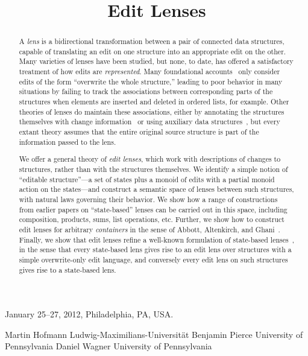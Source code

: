 \documentclass{sigplanconf}
\begin{document}
 {January 25--27, 2012, Philadelphia, PA, USA.}

\title{Edit Lenses}
\ifanon
\authorinfo
    {}
    {}
    {}
\else
\authorinfo
    {Martin Hofmann}
    {Ludwig-Maximilians-Universit\"at}
    {}
\authorinfo
    {Benjamin Pierce}
    {University of Pennsylvania}
    {}
\authorinfo
    {Daniel Wagner}
    {University of Pennsylvania}
    {}
\fi

\maketitle
\begin{abstract}
A {\em lens} is a bidirectional transformation between a pair of connected
data structures, capable of translating an edit on one structure into an
appropriate edit on the other.
%
Many varieties of lenses have been studied, but none, to date, has offered a
satisfactory treatment of how edits are {\em represented}.  Many
foundational accounts~\cite{Focal2005,HofmannPierceWagner10} only consider
edits of the form ``overwrite the whole structure,'' leading to poor
behavior in many situations by failing to track the
associations between corresponding parts of the structures when elements are
inserted and deleted in ordered lists, for example.  Other theories of
lenses do maintain these associations, either by annotating the structures
themselves with change information~\cite{HuModels07,
  Hidaka10}\iflater{}\fi{} or using auxiliary data
structures~\cite{Matching10, Diskin-Delta11}, but every extant theory assumes
that the entire original source structure is part of the information passed
to the lens.

We offer a general theory of {\em edit lenses}, which work with
descriptions of changes to structures, rather than with the structures
themselves.  We identify a simple notion of ``editable structure''---a set
of states plus a monoid of edits with a partial monoid action on the states---and
construct a semantic space of lenses between such structures, with natural
laws governing their behavior.  We show how a range of constructions from
earlier papers on ``state-based'' lenses can be carried out in this space,
including composition, products, sums, list operations, etc.  Further, we show
how to construct edit lenses for arbitrary {\em containers} in the sense of
Abbott, Altenkirch, and Ghani~\cite{1195941}. Finally, we show that edit
lenses refine a well-known formulation of state-based
lenses~\cite{HofmannPierceWagner10}, in the sense that every state-based
lens gives rise to an edit lens over structures with a simple overwrite-only
edit language, and conversely every edit lens on such structures gives rise
to a state-based lens.
\end{abstract}
\end{document}
